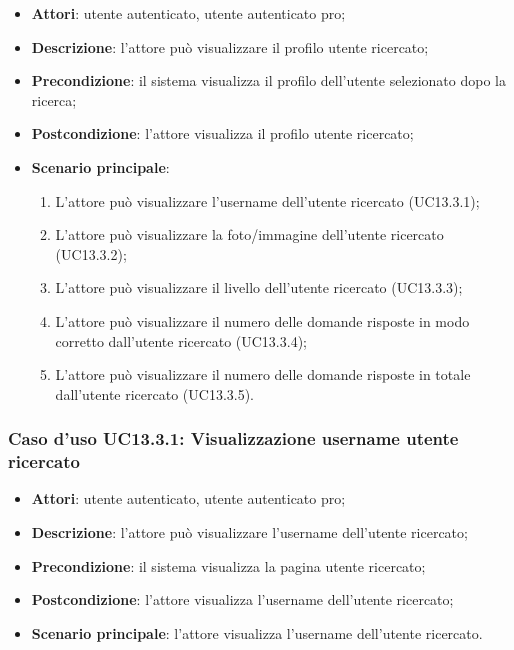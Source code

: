 \begin{itemize}
	\item \textbf{Attori}: utente autenticato, utente autenticato pro;
	\item \textbf{Descrizione}: l'attore può visualizzare il profilo utente ricercato;
	\item \textbf{Precondizione}: il sistema visualizza il profilo dell'utente selezionato dopo la ricerca;
	\item \textbf{Postcondizione}: l'attore visualizza il profilo utente ricercato;
	\item \textbf{Scenario principale}:
	\begin{enumerate}
		\item L'attore può visualizzare l'username dell'utente ricercato (UC13.3.1);
		\item L'attore può visualizzare la foto/immagine dell'utente ricercato (UC13.3.2);
		\item L'attore può visualizzare il livello dell'utente ricercato (UC13.3.3);
		\item L'attore può visualizzare il numero delle domande risposte in modo corretto dall'utente ricercato (UC13.3.4);
		\item L'attore può visualizzare il numero delle domande risposte in totale dall'utente ricercato (UC13.3.5).
	\end{enumerate}
\end{itemize}

\subsubsection{Caso d'uso UC13.3.1: Visualizzazione username utente ricercato}
\begin{itemize}
	\item\textbf{Attori}: utente autenticato, utente autenticato pro;
	\item\textbf{Descrizione}: l'attore può visualizzare l'username dell'utente ricercato;
	\item\textbf{Precondizione}: il sistema visualizza la pagina utente ricercato;
	\item\textbf{Postcondizione}: l'attore visualizza l'username dell'utente ricercato;
	\item\textbf{Scenario principale}: l'attore visualizza l'username dell'utente ricercato.
\end{itemize}

